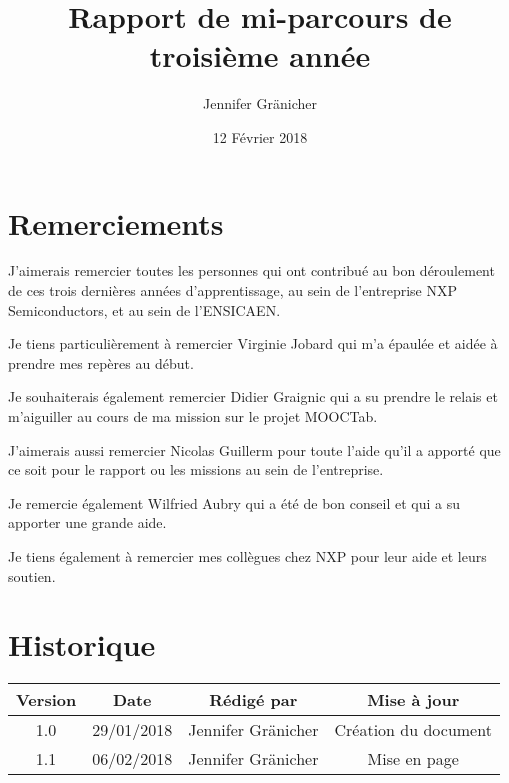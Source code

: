\documentclass[french,12pt,a4paper,titlepage,openright,openbib]{report}
\title{Rapport de mi-parcours de troisième année}
\author{Jennifer Gr\"{a}nicher}
\date{12 Février 2018}
\begin{document}



\maketitle

\chapter*{Remerciements}

J'aimerais remercier toutes les personnes qui ont contribué au bon déroulement de ces trois dernières années d'apprentissage, au sein de l'entreprise NXP Semiconductors, et au sein de l'ENSICAEN.

Je tiens particulièrement à remercier Virginie Jobard qui m'a épaulée et aidée à prendre mes repères au début.

Je souhaiterais également remercier Didier Graignic qui a su prendre le relais et m'aiguiller au cours de ma mission sur le projet MOOCTab.

J'aimerais aussi remercier Nicolas Guillerm pour toute l'aide qu'il a apporté que ce soit pour le rapport ou les missions au sein de l'entreprise.

Je remercie également Wilfried Aubry qui a été de bon conseil et qui a su apporter une grande aide.

Je tiens également à remercier mes collègues chez NXP pour leur aide et leurs soutien.


\tableofcontents

\chapter*{Historique}
\begin{table}[ht]
	\label{tab:historique}
	\centering
	\begin{tabular}{|c|c|c|c|}
		\hline
		{\bf Version} & {\bf Date} & {\bf Rédigé par}    & {\bf Mise à jour}    \\
		\hline
		1.0           & 29/01/2018 & Jennifer Gränicher  & Création du document \\
		\hline
		1.1           & 06/02/2018 & Jennifer Gränicher  & Mise en page \\
		\hline
	\end{tabular}
\end{table}

\vspace{2cm}
\end{document}

